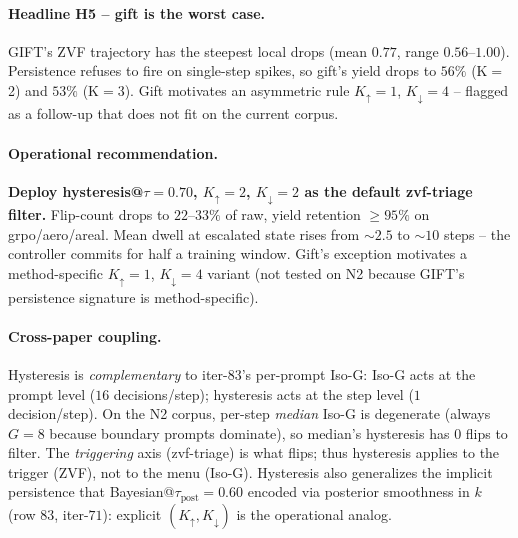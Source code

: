 \paragraph{Headline H5 -- gift is the worst case.}
GIFT's ZVF trajectory has the steepest local drops (mean $0.77$,
range $0.56$--$1.00$).  Persistence refuses to fire on
single-step spikes, so gift's yield drops to $56\%$ (K$=$2)
and $53\%$ (K$=$3).  Gift motivates an asymmetric rule
$K_{\uparrow}{=}1$, $K_{\downarrow}{=}4$ -- flagged as a
follow-up that does not fit on the current corpus.

\paragraph{Operational recommendation.}
\textbf{Deploy hysteresis@$\tau = 0.70$, $K_{\uparrow} = 2$,
$K_{\downarrow} = 2$ as the default zvf-triage filter.}
Flip-count drops to $22$--$33\%$ of raw, yield retention $\ge 95\%$
on grpo/aero/areal.  Mean dwell at escalated state rises from
$\sim 2.5$ to $\sim 10$ steps -- the controller commits for half
a training window.  Gift's exception motivates a method-specific
$K_{\uparrow} = 1$, $K_{\downarrow} = 4$ variant (not tested
on N2 because GIFT's persistence signature is method-specific).

\paragraph{Cross-paper coupling.}
Hysteresis is \emph{complementary} to iter-83's per-prompt
Iso-G: Iso-G acts at the prompt level ($16$ decisions/step);
hysteresis acts at the step level ($1$ decision/step).
On the N2 corpus, per-step \emph{median} Iso-G is degenerate
(always $G = 8$ because boundary prompts dominate), so
median's hysteresis has $0$ flips to filter.  The
\emph{triggering} axis (zvf-triage) is what flips; thus
hysteresis applies to the trigger (ZVF), not to the menu (Iso-G).
Hysteresis also generalizes the implicit persistence that
Bayesian@$\tau_{\mathrm{post}}{=}0.60$ encoded via posterior
smoothness in $k$ (row $83$, iter-$71$): explicit
$(K_{\uparrow}, K_{\downarrow})$ is the operational analog.

